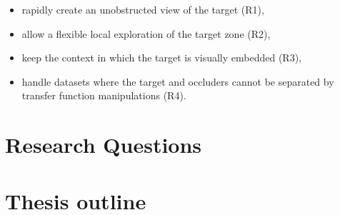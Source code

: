 \begin{itemize}

\item rapidly create an unobstructed view of the target (R1),

\item allow a flexible local exploration of the target zone (R2),

\item keep the context in which the target is visually embedded (R3),

\item handle datasets where the target and occluders cannot 
be separated by transfer function manipulations (R4).

\end{itemize}

\section{Research Questions}

\section{ Thesis outline }

